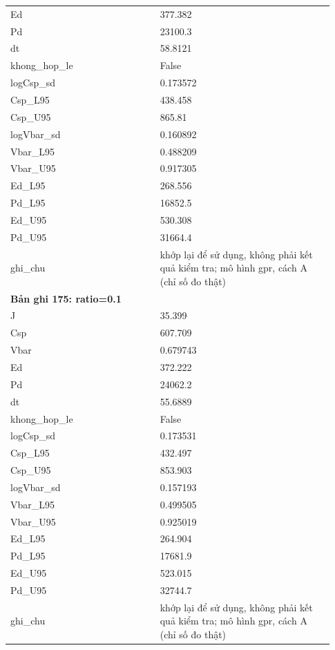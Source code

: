 \begin{longtable}{p{0.43\linewidth}p{0.50\linewidth}}
Ed & 377.382 \\
Pd & 23100.3 \\
dt & 58.8121 \\
khong\_\allowbreak hop\_\allowbreak le & False \\
logCsp\_\allowbreak sd & 0.173572 \\
Csp\_\allowbreak L95 & 438.458 \\
Csp\_\allowbreak U95 & 865.81 \\
logVbar\_\allowbreak sd & 0.160892 \\
Vbar\_\allowbreak L95 & 0.488209 \\
Vbar\_\allowbreak U95 & 0.917305 \\
Ed\_\allowbreak L95 & 268.556 \\
Pd\_\allowbreak L95 & 16852.5 \\
Ed\_\allowbreak U95 & 530.308 \\
Pd\_\allowbreak U95 & 31664.4 \\
ghi\_\allowbreak chu & khớp lại để sử dụng, không phải kết quả kiểm tra; mô hình gpr, cách A (chỉ số đo thật) \\
\midrule
\multicolumn{2}{p{0.95\linewidth}}{\textbf{Bản ghi 175: ratio=0.1}} \\
J & 35.399 \\
Csp & 607.709 \\
Vbar & 0.679743 \\
Ed & 372.222 \\
Pd & 24062.2 \\
dt & 55.6889 \\
khong\_\allowbreak hop\_\allowbreak le & False \\
logCsp\_\allowbreak sd & 0.173531 \\
Csp\_\allowbreak L95 & 432.497 \\
Csp\_\allowbreak U95 & 853.903 \\
logVbar\_\allowbreak sd & 0.157193 \\
Vbar\_\allowbreak L95 & 0.499505 \\
Vbar\_\allowbreak U95 & 0.925019 \\
Ed\_\allowbreak L95 & 264.904 \\
Pd\_\allowbreak L95 & 17681.9 \\
Ed\_\allowbreak U95 & 523.015 \\
Pd\_\allowbreak U95 & 32744.7 \\
ghi\_\allowbreak chu & khớp lại để sử dụng, không phải kết quả kiểm tra; mô hình gpr, cách A (chỉ số đo thật) \\

\end{longtable}
